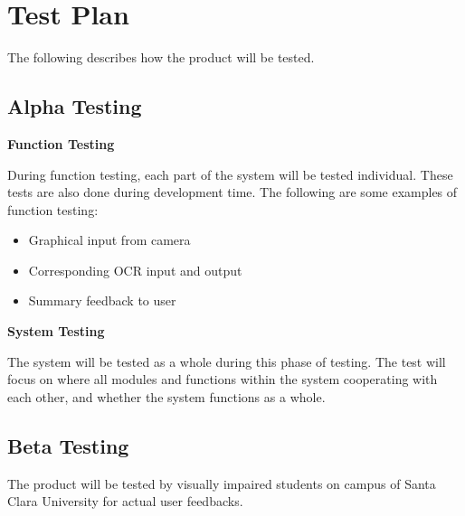 \chapter{Test Plan}

	The following describes how the product will be tested.


	\section{Alpha Testing}
		\textbf{Function Testing}

		During function testing, each part of the system will be tested individual. These tests are also done during development time.
		The following are some examples of function testing:
		\begin{itemize}
			\item Graphical input from camera
			\item Corresponding OCR input and output
			\item Summary feedback to user
		\end{itemize}

		\textbf{System Testing}

		The system will be tested as a whole during this phase of testing. The test will focus on where all modules and functions within the system cooperating with each other, and whether the system functions as a whole.

	\section{Beta Testing}
	The product will be tested by visually impaired students on campus of Santa Clara University for actual user feedbacks.